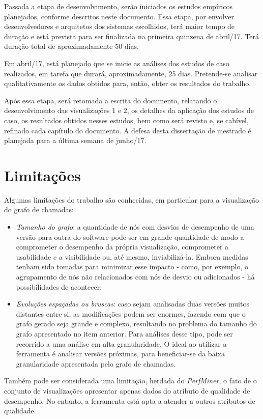 Passada a etapa de desenvolvimento, serão iniciados os estudos empíricos planejados, conforme descritos neste documento. Essa etapa, por envolver desenvolvedores e arquitetos dos sistemas escolhidos, terá maior tempo de duração e está prevista para ser finalizada na primeira quinzena de abril/17. Terá duração total de aproximadamente 50 dias.

Em abril/17, está planejado que se inicie as análises dos estudos de caso realizados, em tarefa que durará, aproximadamente, 25 dias. Pretende-se analisar qualitativamente os dados obtidos para, então, obter os resultados do trabalho.

Após essa etapa, será retomada a escrita do documento, relatando o desenvolvimento das visualizações 1 e 2, os detalhes da aplicação dos estudos de caso, os resultados obtidos nesses estudos, bem como será revisto e, se cabível, refinado cada capítulo do documento. A defesa desta dissertação de mestrado é planejada para a última semana de junho/17.

\section{Limitações} \label{sec:limitacoes}

Algumas limitações do trabalho são conhecidas, em particular para a visualização do grafo de chamadas:
\begin{itemize}
	\item \textit{Tamanho do grafo}: a quantidade de nós com desvios de desempenho de uma versão para outra do software pode ser em grande quantidade de modo a comprometer o desempenho da própria visualização, comprometer a usabilidade e a visibilidade ou, até mesmo, inviabilizá-la. Embora medidas tenham sido tomadas para minimizar esse impacto - como, por exemplo, o agrupamento de nós não relacionados com nós de desvio ou adicionados - há possibilidades de acontecer;
	\item \textit{Evoluções espaçadas ou bruscas}: caso sejam analisadas duas versões muitos distantes entre si, as modificações podem ser enormes, fazendo com que o grafo gerado seja grande e complexo, resultando no problema do tamanho do grafo apresentado no item anterior. Para análises desse tipo, pode ser recorrido a uma análise em alta granularidade. O ideal ao utilizar a ferramenta é analisar versões próximas, para beneficiar-se da baixa granularidade apresentada pelo grafo de chamadas.
\end{itemize}

Também pode ser considerada uma limitação, herdada do \textit{PerfMiner}, o fato de o conjunto de visualizações apresentar apenas dados do atributo de qualidade de  desempenho. No entanto, a ferramenta está apta a atender a outros atributos de qualidade.